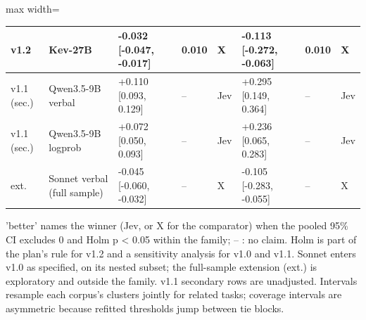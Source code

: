 \begin{table}[t]
\begin{adjustbox}{max width=\linewidth}
\begin{tabular}{llllllll}
v1.2 & Kev-27B & -0.032 [-0.047, -0.017] & 0.010 & X & -0.113 [-0.272, -0.063] & 0.010 & X \\
\midrule
v1.1 (sec.) & Qwen3.5-9B verbal & +0.110 [0.093, 0.129] & -- & Jev & +0.295 [0.149, 0.364] & -- & Jev \\
v1.1 (sec.) & Qwen3.5-9B logprob & +0.072 [0.050, 0.093] & -- & Jev & +0.236 [0.065, 0.283] & -- & Jev \\
\midrule
ext. & Sonnet verbal (full sample) & -0.045 [-0.060, -0.032] & -- & X & -0.105 [-0.283, -0.055] & -- & X \\
\bottomrule
\end{tabular}
\end{adjustbox}
\par\smallskip\footnotesize\raggedright 'better' names the winner (Jev, or X for the comparator) when the pooled 95\% CI excludes 0 and Holm p < 0.05 within the family; -- : no claim. Holm is part of the plan's rule for v1.2 and a sensitivity analysis for v1.0 and v1.1. Sonnet enters v1.0 as specified, on its nested subset; the full-sample extension (ext.) is exploratory and outside the family. v1.1 secondary rows are unadjusted. Intervals resample each corpus's clusters jointly for related tasks; coverage intervals are asymmetric because refitted thresholds jump between tie blocks.
\end{table}
